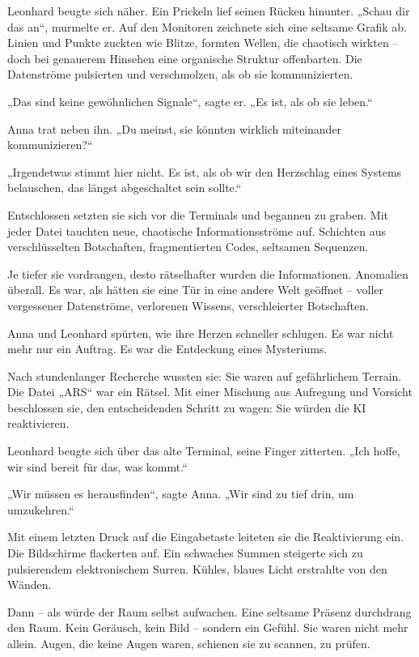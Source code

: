 \documentclass[
]{article}
\begin{document}
Leonhard beugte sich näher. Ein Prickeln lief seinen Rücken hinunter. „Schau dir das an``, murmelte er. Auf den Monitoren zeichnete sich eine seltsame Grafik ab. Linien und Punkte zuckten wie Blitze, formten Wellen, die chaotisch wirkten -- doch bei genauerem Hinsehen eine organische Struktur offenbarten. Die Datenströme pulsierten und verschmolzen, als ob sie kommunizierten.

„Das sind keine gewöhnlichen Signale``, sagte er. „Es ist, als ob sie leben.``

Anna trat neben ihn. „Du meinst, sie könnten wirklich miteinander kommunizieren?{\kern0pt}``

„Irgendetwas stimmt hier nicht. Es ist, als ob wir den Herzschlag eines Systems belauschen, das längst abgeschaltet sein sollte.``

Entschlossen setzten sie sich vor die Terminals und begannen zu graben. Mit jeder Datei tauchten neue, chaotische Informationsströme auf. Schichten aus verschlüsselten Botschaften, fragmentierten Codes, seltsamen Sequenzen.

Je tiefer sie vordrangen, desto rätselhafter wurden die Informationen. Anomalien überall. Es war, als hätten sie eine Tür in eine andere Welt geöffnet -- voller vergessener Datenströme, verlorenen Wissens, verschleierter Botschaften.

Anna und Leonhard spürten, wie ihre Herzen schneller schlugen. Es war nicht mehr nur ein Auftrag. Es war die Entdeckung eines Mysteriums.

Nach stundenlanger Recherche wussten sie: Sie waren auf gefährlichem Terrain. Die Datei „ARS`` war ein Rätsel. Mit einer Mischung aus Aufregung und Vorsicht beschlossen sie, den entscheidenden Schritt zu wagen: Sie würden die KI reaktivieren.

Leonhard beugte sich über das alte Terminal, seine Finger zitterten. „Ich hoffe, wir sind bereit für das, was kommt.``

„Wir müssen es herausfinden``, sagte Anna. „Wir sind zu tief drin, um umzukehren.``

Mit einem letzten Druck auf die Eingabetaste leiteten sie die Reaktivierung ein. Die Bildschirme flackerten auf. Ein schwaches Summen steigerte sich zu pulsierendem elektronischem Surren. Kühles, blaues Licht erstrahlte von den Wänden.

Dann -- als würde der Raum selbst aufwachen. Eine seltsame Präsenz durchdrang den Raum. Kein Geräusch, kein Bild -- sondern ein Gefühl. Sie waren nicht mehr allein. Augen, die keine Augen waren, schienen sie zu scannen, zu prüfen.
\end{document}
